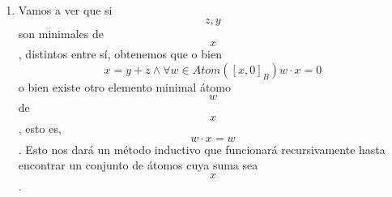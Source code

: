 \documentclass[
]{article}
\providecommand{\tightlist}{%
  \setlength{\itemsep}{0pt}\setlength{\parskip}{0pt}}
\begin{document}
\begin{enumerate}
\begin{enumerate}
\begin{enumerate}
\begin{enumerate}
\begin{enumerate}
\begin{enumerate}
            \begin{enumerate}
            \def\labelenumvii{\arabic{enumvii}.}
            \tightlist
            \item
              \[{{{z \cdot {({x + y})}} = {{({z \cdot x})} + {({z \cdot y})}}} = {0 + 0}} = 0\]
            \item
              \[{{({x + y})} + z} = 1\]
            \item
              \[{z = \overline{x+y}}\mathit{ABSURDO}\]
            \item
              \[\forall{z \in B}{z \in {({B_{2}@{\mathit{Atom}{(B)}}@{\mathit{Htom}{(B)}}})}}\]
            \item
              \[\#{{(B)} = 8}\]
            \end{enumerate}
          \end{enumerate}
        \end{enumerate}
      \item
        Todos las álgebras de Boole finitas de cardinal 8 son isomorfas
        entre sí. Por lo visto hasta ahora, queda
        \[{B = \underset{B_{2}}{\underbrace{\{ 0,1\}}}}@\underset{\mathit{Atom}{(B)}}{\underbrace{\{{a,b,\overline{a+b}}\}}}@\underset{\mathit{Htom}{(B)}}{\underbrace{\{{\overline{a},\overline{b},{a + b}}\}}}\]y
        si tenemos un segundo conjunto de Boole talque

        \[B{' = \underset{B'_{2}}{\underbrace{\{{0',1'}\}}}}@\underset{\mathit{Atom}{({B'})}}{\underbrace{\{{a',b',\overline{a'+_{2}b'}}\}}}@\underset{\mathit{Htom}{({B'})}}{\underbrace{\{{\overline{a},\overline{b},{a +_{2}b}}\}}}\]basta
        con construir el siguiente isomorfismo:

        \[\varphi:{B\rightarrow B}'::x\mapsto\varphi{(x)} ≝ \begin{Bmatrix}
        {0'\Leftarrow{x = 0}} \\
        {1'\Leftarrow{x = 1}} \\
        {a'\Leftarrow{x = a}} \\
        {b'\Leftarrow{x = b}} \\
        {\overline{a'+_{2}b'}\Leftarrow{x = \overline{a+b}}} \\
        {\overline{a'}\Leftarrow{x = \overline{a}}} \\
        {\overline{b'}\Leftarrow{x = \overline{b}}} \\
        {\overline{a'+_{2}b'}\Leftarrow{x = {a + b}}}
        \end{Bmatrix}\]
      \end{enumerate}
    \item
      Vamos a ver que si \[z,y\] son minimales de \[x\], distintos entre
      sí, obtenemos que o bien
      \[{x = {y + z}}{\land}\forall{w \in \mathit{Atom}}{(\left\lbrack {x,0} \right\rbrack_{B})}{{w \cdot x} = 0}\]
      o bien existe otro elemento minimal átomo \[w\] de \[x\], esto es,
      \[{w \cdot x} = w\]. Esto nos dará un método inductivo que
      funcionará recursivamente hasta encontrar un conjunto de átomos
      cuya suma sea \[x\].


\end{enumerate}
\end{enumerate}
\end{enumerate}
\end{document}
